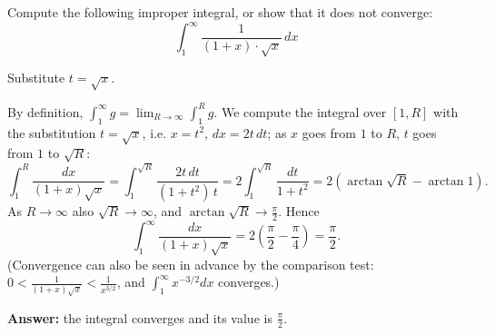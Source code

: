 
\begin{question}
Compute the following improper integral, or show that it does not converge:
\[ \int_1^\infty \frac{1}{(1+x)\cdot\sqrt{x}}\,dx \]
\end{question}

\begin{hint}
Substitute $t = \sqrt{x}$.
\end{hint}

\begin{solution}
By definition, $\int_1^\infty g = \lim_{R\to\infty}\int_1^R g$. We compute the integral over $[1,R]$ with the substitution $t = \sqrt{x}$, i.e. $x = t^2$, $dx = 2t\,dt$; as $x$ goes from $1$ to $R$, $t$ goes from $1$ to $\sqrt R$:
\[ \int_1^R \frac{dx}{(1+x)\sqrt{x}} = \int_1^{\sqrt R}\frac{2t\,dt}{(1+t^2)\,t} = 2\int_1^{\sqrt R}\frac{dt}{1+t^2} = 2\left(\arctan\sqrt R - \arctan 1\right). \]
As $R \to \infty$ also $\sqrt R \to \infty$, and $\arctan\sqrt R \to \frac\pi2$. Hence
\[ \int_1^\infty \frac{dx}{(1+x)\sqrt{x}} = 2\left(\frac\pi2 - \frac\pi4\right) = \frac{\pi}{2}. \]
(Convergence can also be seen in advance by the comparison test: $0 < \frac{1}{(1+x)\sqrt x} < \frac{1}{x^{3/2}}$, and $\int_1^\infty x^{-3/2}dx$ converges.)

\textbf{Answer:} the integral converges and its value is $\frac{\pi}{2}$.
\end{solution}
